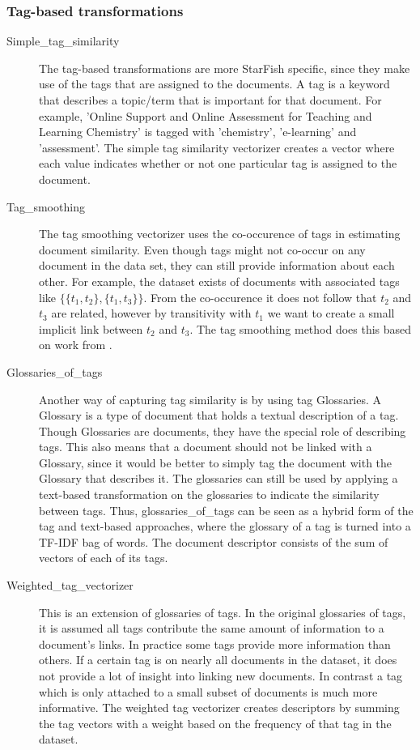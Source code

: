 \subsubsection{Tag-based transformations}
\begin{description}
\item[Simple\_tag\_similarity] The tag-based transformations are more StarFish specific, since they make use of the tags that are assigned to the documents. A tag is a keyword that describes a topic/term that is important for that document. For example, 'Online Support and Online Assessment for Teaching and Learning Chemistry' is tagged with 'chemistry', 'e-learning' and 'assessment'. The simple tag similarity vectorizer creates a vector where each value indicates whether or not one particular tag is assigned to the document. 

\item [Tag\_smoothing] The tag smoothing vectorizer uses the co-occurence of tags in estimating document similarity. Even though tags might not co-occur on any document in the data set, they can still provide information about each other. For example, the dataset exists of documents with associated tags like $\{\{t_1, t_2\}, \{t_1, t_3\}\}$. From the co-occurence it does not follow that $t_2$ and $t_3$ are related, however by transitivity with $t_1$ we want to create a small implicit link between $t_2$ and $t_3$. The tag smoothing method does this based on work from \citet{zhou2011web}.

\item [Glossaries\_of\_tags] Another way of capturing tag similarity is by using tag Glossaries. A Glossary is a type of document that holds a textual description of a tag. Though Glossaries are documents, they have the special role of describing tags. This also means that a document should not be linked with a Glossary, since it would be better to simply tag the document with the Glossary that describes it. The glossaries can still be used by applying a text-based transformation on the glossaries to indicate the similarity between tags. Thus, glossaries\_of\_tags can be seen as a hybrid form of the tag and text-based approaches, where the glossary of a tag is turned into a TF-IDF bag of words. The document descriptor consists of the sum of vectors of each of its tags. 

\item [Weighted\_tag\_vectorizer] This is an extension of glossaries of tags. In the original glossaries of tags, it is assumed all tags contribute the same amount of information to a document's links. In practice some tags provide more information than others. If a certain tag is on nearly all documents in the dataset, it does not provide a lot of insight into linking new documents. In contrast a tag which is only attached to a small subset of documents is much more informative. The weighted tag vectorizer creates descriptors by summing the tag vectors with a weight based on the frequency of that tag in the dataset.

\end{description}

